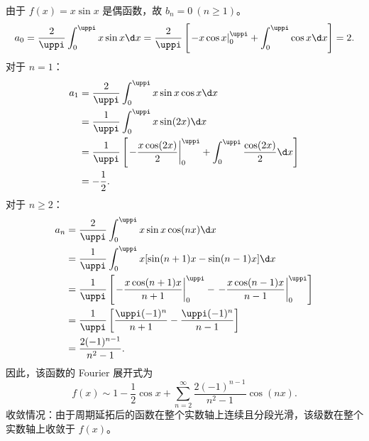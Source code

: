 \begin{solution}
    由于 $f(x) = x \sin x$ 是偶函数，故 $b_n = 0 \ (n \geqslant 1)$。
    \begin{equation}\label{eq:xsinx-a0}
        a_0 = \frac{2}{\uppi} \int_{0}^{\uppi} x \sin x \d x = \frac{2}{\uppi} \left[ \left. -x \cos x \right|_{0}^{\uppi} + \int_{0}^{\uppi} \cos x \d x \right] = 2.
    \end{equation}
    对于 $n = 1$：
    \begin{equation}\label{eq:xsinx-a1}
        \begin{aligned}
            a_1 & = \frac{2}{\uppi} \int_{0}^{\uppi} x \sin x \cos x \d x                                                                      \\
                & = \frac{1}{\uppi} \int_{0}^{\uppi} x \sin(2x) \d x                                                                           \\
                & = \frac{1}{\uppi} \left[ \left. -\frac{x \cos(2x)}{2} \right|_{0}^{\uppi} + \int_{0}^{\uppi} \frac{\cos(2x)}{2} \d x \right] \\
                & = -\frac{1}{2}.
        \end{aligned}
    \end{equation}
    对于 $n \geqslant 2$：
    \begin{equation}\label{eq:xsinx-an}
        \begin{aligned}
            a_n & = \frac{2}{\uppi} \int_{0}^{\uppi} x \sin x \cos(nx) \d x                                                                                    \\
                & = \frac{1}{\uppi} \int_{0}^{\uppi} x [ \sin(n+1)x - \sin(n-1)x ] \d x                                                                        \\
                & = \frac{1}{\uppi} \left[ \left. -\frac{x \cos(n+1)x}{n+1} \right|_{0}^{\uppi} - \left. -\frac{x \cos(n-1)x}{n-1} \right|_{0}^{\uppi} \right] \\
                & = \frac{1}{\uppi} \left[ \frac{\uppi (-1)^n}{n+1} - \frac{\uppi (-1)^n}{n-1} \right]                                                         \\
                & = \frac{2(-1)^{n-1}}{n^2 - 1}.
        \end{aligned}
    \end{equation}
    因此，该函数的 Fourier 展开式为
    \begin{equation}
        \boxed{f(x) \sim 1 - \frac{1}{2} \cos x + \sum_{n=2}^{\infty} \frac{2(-1)^{n-1}}{n^2 - 1} \cos(nx)}.
    \end{equation}
    收敛情况：由于周期延拓后的函数在整个实数轴上连续且分段光滑，该级数在整个实数轴上收敛于 $f(x)$。
\end{solution}

